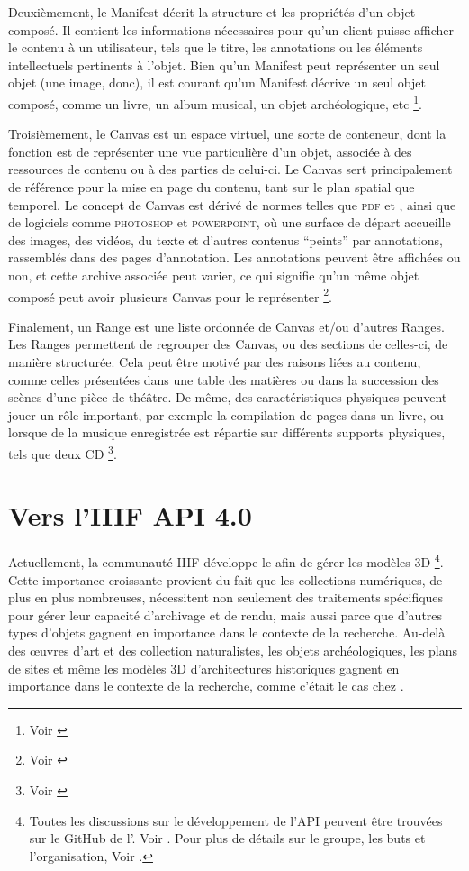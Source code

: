     Deuxièmement, le Manifest décrit la structure et les propriétés d'un objet composé. Il contient les informations nécessaires pour qu'un client puisse afficher le contenu à un utilisateur, tels que le titre, les annotations ou les éléments intellectuels pertinents à l'objet. Bien qu’un Manifest peut représenter un seul objet (une image, donc), il est courant qu'un Manifest décrive un seul objet composé, comme un livre, un album musical, un objet archéologique, etc \footnote{Voir \cite{iiifpresentation30}}.
    
    Troisièmement, le Canvas est un espace virtuel, une sorte de conteneur, dont la fonction est de représenter une vue particulière d'un objet, associée à des ressources de contenu ou à des parties de celui-ci. Le Canvas sert principalement de référence pour la mise en page du contenu, tant sur le plan spatial que temporel. Le concept de Canvas est dérivé de normes telles que \textsc{pdf} et \html, ainsi que de logiciels comme \textsc{photoshop} et \textsc{powerpoint}, où une surface de départ accueille des images, des vidéos, du texte et d'autres contenus \enquote{peints} par annotations, rassemblés dans des pages d'annotation. Les annotations peuvent être affichées ou non, et cette archive associée peut varier, ce qui signifie qu'un même objet composé peut avoir plusieurs Canvas pour le représenter \footnote{Voir \cite{iiifpresentation30}}.
    
    Finalement, un Range est une liste ordonnée de Canvas et/ou d’autres Ranges. Les Ranges permettent de regrouper des Canvas, ou des sections de celles-ci, de manière structurée. Cela peut être motivé par des raisons liées au contenu, comme celles présentées dans une table des matières ou dans la succession des scènes d'une pièce de théâtre. De même, des caractéristiques physiques peuvent jouer un rôle important, par exemple la compilation de pages dans un livre, ou lorsque de la musique enregistrée est répartie sur différents supports physiques, tels que deux CD \footnote{Voir \cite{iiifpresentation30}}.

    \section{Vers l'IIIF API 4.0}
    
    Actuellement, la communauté IIIF développe le \papiq afin de gérer les modèles 3D \footnote{Toutes les discussions sur le développement de l'API peuvent être trouvées sur le GitHub de l'. Voir \cite{iiif3d}. Pour plus de détails sur le groupe, les buts et l'organisation, Voir \cite{iiif3dtsg}.}. Cette importance croissante provient du fait que les collections numériques, de plus en plus nombreuses, nécessitent non seulement des traitements spécifiques pour gérer leur capacité d'archivage et de rendu, mais aussi parce que d'autres types d'objets gagnent en importance dans le contexte de la recherche. Au-delà des œuvres d'art et des collection naturalistes, les objets archéologiques, les plans de sites et même les modèles 3D d'architectures historiques gagnent en importance dans le contexte de la recherche, comme c'était le cas chez \dsc.

